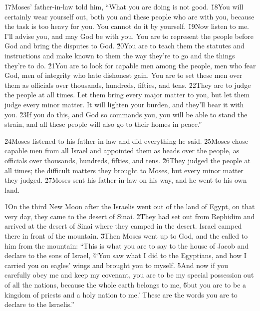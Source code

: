 \v{17}Moses' father-in-law told him, ``What you are doing is not good. \v{18}You will certainly wear yourself out, both you and these people who are with you, because the task is too heavy for you. You cannot do it by yourself. \v{19}Now listen to me. I'll advise you, and may God be with you. You are to represent the people before God and bring the disputes to God. \v{20}You are to teach them the statutes and instructions and make known to them the way they're to go and the things they're to do. \v{21}You are to look for capable men among the people, men who fear God, men of integrity who hate dishonest gain. You are to set these men over them as officials over thousands, hundreds, fifties, and tens. \v{22}They are to judge the people at all times. Let them bring every major matter to you, but let them judge every minor matter. It will lighten your burden, and they'll bear it with you. \v{23}If you do this, and God so commands you, you will be able to stand the strain, and all these people will also go to their homes in peace.''

\v{24}Moses listened to his father-in-law and did everything he said. \v{25}Moses chose capable men from all Israel and appointed them as heads over the people, as officials over thousands, hundreds, fifties, and tens. \v{26}They judged the people at all times; the difficult matters they brought to Moses, but every minor matter they judged. \v{27}Moses sent his father-in-law on his way, and he went to his own land.

\v{1}On the third New Moon after the Israelis went out of the land of Egypt, on that very day, they came to the desert of Sinai. \v{2}They had set out from Rephidim and arrived at the desert of Sinai where they camped in the desert. Israel camped there in front of the mountain. \v{3}Then Moses went up to God, and the  called to him from the mountain: ``This is what you are to say to the house of Jacob and declare to the sons of Israel, \v{4}`You saw what I did to the Egyptians, and how I carried you on eagles' wings and brought you to myself. \v{5}And now if you carefully obey me and keep my covenant, you are to be my special possession out of all the nations, because the whole earth belongs to me, \v{6}but you are to be a kingdom of priests and a holy nation to me.' These are the words you are to declare to the Israelis.''

